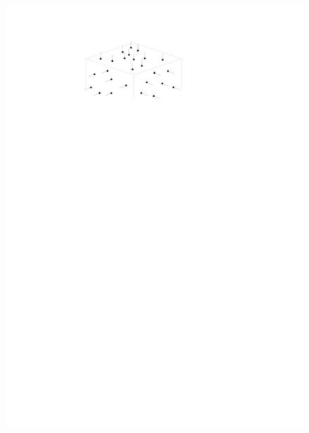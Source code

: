 \begin{marginfigure}
\begin{subfigure}[b]{\linewidth}
    \includegraphics[width=\textwidth,page=2]{normal.pdf}
    \caption{}\label{fig:normal:b}
  \end{subfigure}
  \qquad
  \begin{subfigure}[b]{\linewidth}
    \centering

\end{subfigure}
\end{marginfigure}
